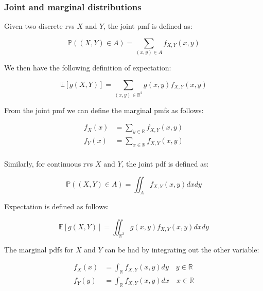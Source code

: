 \documentclass{report}
\renewcommand{\arraystretch}{1.5}
\begin{document}
\renewcommand{\arraystretch}{1.5}

\subsubsection{Joint and marginal distributions}

Given two discrete \glspl{rv} $X$ and $Y$, the joint \gls{pmf} is defined as:

\begin{equation}\label{eq:joint-pmf}
    \mathbb{P}((X, Y) \in A) = \sum_{(x,y) \in A} f_{X, Y}(x, y)
\end{equation}

We then have the following definition of expectation:

\begin{equation}\label{eq:joint-expectation-discrete}
    \mathbb{E}[g(X,Y)] = \sum_{(x,y) \in \mathbb{R}^2} g(x,y)f_{X, Y}(x,y)
\end{equation}

From the joint \gls{pmf} we can define the marginal \glspl{pmf} as follows:

\begin{equation}
    \begin{aligned}
        f_X(x) &= \sum_{y \in \mathbb{R}} f_{X, Y}(x,y) \\
        f_Y(x) &= \sum_{x \in \mathbb{R}} f_{X, Y}(x,y) \\
    \end{aligned}
\end{equation}

Similarly, for continuous \glspl{rv} $X$ and $Y$, the joint \gls{pdf} is defined as:

\begin{equation}\label{eq:joint-pdf}
    \mathbb{P}((X,Y) \in A) = \iint_A f_{X, Y}(x,y) dxdy
\end{equation}

Expectation is defined as follows:

\begin{equation}\label{eq:joint-expectation-continuous}
    \mathbb{E}[g(X,Y)] = \iint_{\mathbb{R}^2} g(x,y)f_{X, Y}(x,y) dxdy
\end{equation}

The marginal \glspl{pdf} for $X$ and $Y$ can be had by integrating out the other variable:

\begin{equation}
    \begin{aligned}
        f_X(x) &= \int_{\mathbb{R}} f_{X, Y}(x,y) dy \quad y \in \mathbb{R} \\
        f_Y(y) &= \int_{\mathbb{R}} f_{X, Y}(x,y) dx \quad x \in \mathbb{R} \\
    \end{aligned}
\end{equation}
\end{document}
